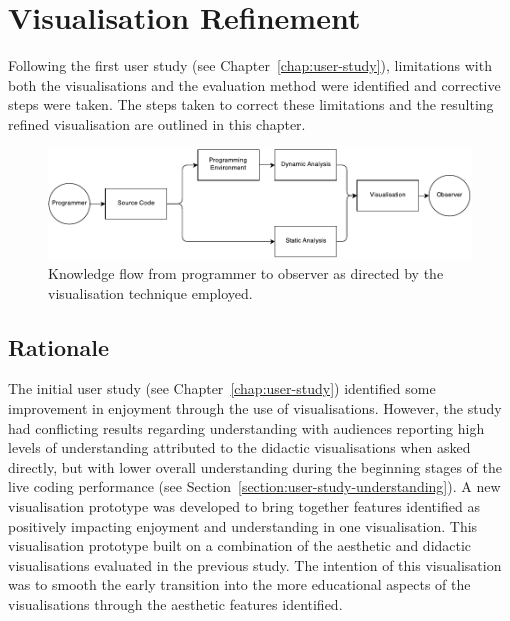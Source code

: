 
\chapter{Visualisation Refinement}
\label{chap:visualisation-refinement}

Following the first user study (see Chapter~\ref{chap:user-study}), limitations with both the visualisations and the evaluation method were identified and corrective steps were taken. The steps taken to correct these limitations and the resulting refined visualisation are outlined in this chapter.

\begin{figure}
  \centering \includegraphics[width=\columnwidth]{../images/diagrams/knowledge-flow-refined.pdf}
  \caption{Knowledge flow from programmer to observer as directed by the visualisation technique employed.}
\label{fig:knowledge-flow-refined}
\end{figure}

\section{Rationale}

The initial user study (see Chapter~\ref{chap:user-study}) identified some improvement in enjoyment through the use of visualisations. However, the study had conflicting results regarding understanding with audiences reporting high levels of understanding attributed to the didactic visualisations when asked directly, but with lower overall understanding during the beginning stages of the live coding performance (see Section~\ref{section:user-study-understanding}). A new visualisation prototype was developed to bring together features identified as positively impacting enjoyment and understanding in one visualisation. This visualisation prototype built on a combination of the aesthetic and didactic visualisations evaluated in the previous study. The intention of this visualisation was to smooth the early transition into the more educational aspects of the visualisations through the aesthetic features identified.

